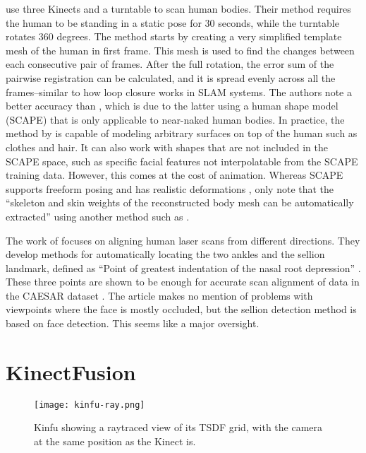 \citet{tongscanning} use three Kinects and a turntable to scan human bodies. Their method requires the human to be standing in a static pose for 30 seconds, while the turntable rotates 360 degrees. The method starts by creating a very simplified template mesh of the human in first frame. This mesh is used to find the changes between each consecutive pair of frames. After the full rotation, the error sum of the pairwise registration can be calculated, and it is spread evenly across all the frames--similar to how loop closure works in SLAM systems. The authors note a better accuracy than \citep{weiss2011home}, which is due to the latter using a human shape model (SCAPE) that is only applicable to near-naked human bodies. In practice, the method by \citeauthor{tongscanning} is capable of modeling arbitrary surfaces on top of the human such as clothes and hair. It can also work with shapes that are not included in the SCAPE space, such as specific facial features not interpolatable from the SCAPE training data. However, this comes at the cost of animation. Whereas SCAPE supports freeform posing and has realistic deformations \citep{anguelov2005scape}, \citet{tongscanning} only note that the ``skeleton and skin weights of the reconstructed body mesh can be automatically extracted'' using another method such as \citep{baran2007automatic}.

\newtopic

The work of \citet{hirshbergc2011evaluating} focuses on aligning human laser scans from different directions. They develop methods for automatically locating the two ankles and the sellion landmark, defined as ``Point of greatest indentation of the nasal root depression'' \citep{blackwell2002civilian}. These three points are shown to be enough for accurate scan alignment of data in the CAESAR dataset \citep{robinette2002civilian}. The article makes no mention of problems with viewpoints where the face is mostly occluded, but the sellion detection method is based on face detection. This seems like a major oversight.


\section{KinectFusion}

\begin{figure}
    \centering
    \texttt{[image: kinfu-ray.png]}
    \caption{Kinfu showing a raytraced view of its TSDF grid, with the camera at the same position as the Kinect is.}
    \label{fig:kinfu-ray}
\end{figure}

